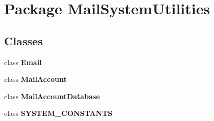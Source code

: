 \section{Package Mail\+System\+Utilities}
\label{namespace_mail_system_utilities}
\subsection*{Classes}
\begin{DoxyCompactItemize}
\item 
class \textbf{ Email}
\item 
class \textbf{ Mail\+Account}
\item 
class \textbf{ Mail\+Account\+Database}
\item 
class \textbf{ S\+Y\+S\+T\+E\+M\+\_\+\+C\+O\+N\+S\+T\+A\+N\+TS}
\end{DoxyCompactItemize}
